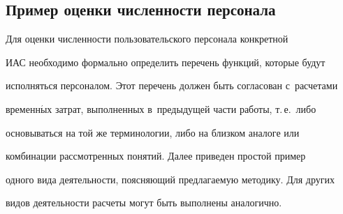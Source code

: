       


\subsection{Пример оценки численности персонала}





      Для оценки численности пользовательского персонала конкретной 


ИАС необходимо формально определить перечень функций, которые будут 


исполняться персоналом. Этот перечень должен быть согласован с~расчетами 


временн$\acute{\mbox{ы}}$х затрат, выполненных в~предыдущей части работы, т.\,е.\ либо 


основываться на той же терминологии, либо на близком аналоге или 


комбинации рас\-смот\-рен\-ных понятий. Далее приведен простой пример


 одного вида деятельности,  поясняющий предлагаемую методику. Для других 


видов деятельности расчеты могут быть выполнены аналогично.







\pagebreak





\





\vspace*{-12pt}





\renewcommand{\figurename}{\protect\bf Таблица}





